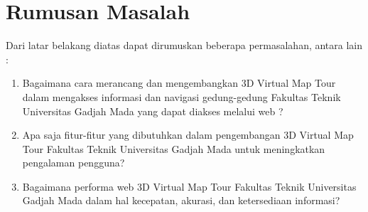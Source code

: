 		


\section{Rumusan Masalah}

Dari latar belakang diatas dapat dirumuskan beberapa permasalahan, antara lain :

\begin{enumerate}
	\item Bagaimana cara merancang dan mengembangkan 3D Virtual Map Tour dalam mengakses informasi dan navigasi gedung-gedung Fakultas Teknik Universitas Gadjah Mada yang dapat diakses melalui web  ?
	
	\item Apa saja fitur-fitur yang dibutuhkan dalam pengembangan 3D Virtual Map Tour Fakultas Teknik Universitas Gadjah Mada untuk meningkatkan pengalaman pengguna?

	\item Bagaimana performa web 3D Virtual Map Tour Fakultas Teknik Universitas Gadjah Mada dalam hal kecepatan, akurasi, dan ketersediaan informasi?
	

\end{enumerate}
	

